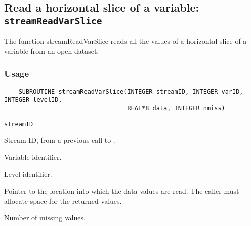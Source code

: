 \subsection{Read a horizontal slice of a variable: {\tt streamReadVarSlice}}
\label{streamReadVarSlice}

The function streamReadVarSlice reads all the values of a horizontal slice of a variable
from an open dataset.
\subsubsection*{Usage}

\begin{verbatim}
    SUBROUTINE streamReadVarSlice(INTEGER streamID, INTEGER varID, INTEGER levelID, 
                                  REAL*8 data, INTEGER nmiss)
\end{verbatim}

\hspace*{4mm}\begin{minipage}[]{15cm}
\begin{deflist}{\tt streamID\ }
\item[{\tt streamID}]
Stream ID, from a previous call to {}.
\item[{\tt varID}]
Variable identifier.
\item[{\tt levelID}]
Level identifier.
\item[{\tt data}]
Pointer to the location into which the data values are read.
                     The caller must allocate space for the returned values.
\item[{\tt nmiss}]
Number of missing values.

\end{deflist}
\end{minipage}
